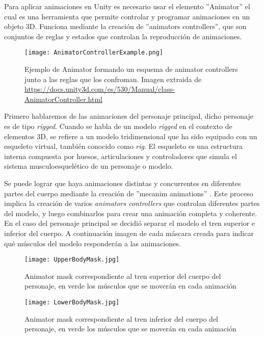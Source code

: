Para aplicar animaciones en Unity es necesario usar el elemento ''Animator'' \cite{AnimatorUnity} el cual es una herramienta que permite controlar y programar animaciones en un objeto 3D. Funciona mediante la creación de ''animators controllers'', que son conjuntos de reglas y estados que controlan la reproducción de animaciones.

\begin{figure}[H]
    \centering
    \texttt{[image: AnimatorControllerExample.png]}
    \caption{Ejemplo de Animator formando un esquema de animator controllers junto a las reglas que los confroman. Imagen extraida de \url{https://docs.unity3d.com/es/530/Manual/class-AnimatorController.html}}
\end{figure}

Primero hablaremos de las animaciones del personaje principal, dicho personaje es de tipo \textit{rigged}. Cuando se habla de un modelo \textit{rigged} en el contexto de elementos 3D, se refiere a un modelo tridimensional que ha sido equipado con un esqueleto virtual, también conocido como \textit{rig}. El esqueleto es una estructura interna compuesta por huesos, articulaciones y controladores que simula el sistema musculoesquelético de un personaje o modelo.

Se puede lograr que haya animaciones distintas y concurrentes en diferentes partes del cuerpo mediante la creación de ''mecanim animations'' \cite{MecanimAnimation}. Este proceso implica la creación de varios \textit{animators controllers} que controlan diferentes partes del modelo, y luego combinarlos para crear una animación completa y coherente. En el caso del personaje principal se decidió separar el modelo el tren superior e inferior del cuerpo. A continuación imagen de cada máscara creada para indicar qué músculos del modelo responderán a las animaciones. 

\begin{figure}[H]
    \centering
    \texttt{[image: UpperBodyMask.jpg]}
    \caption{Animator mask correspondiente al tren superior del cuerpo del personaje, en verde los músculos que se moverán en cada animación}
\end{figure}

\begin{figure}[H]
    \centering
    \texttt{[image: LowerBodyMask.jpg]}
    \caption{Animator mask correspondiente al tren inferior del cuerpo del personaje, en verde los músculos que se moverán en cada animación}
\end{figure}

